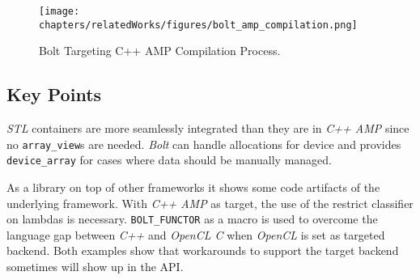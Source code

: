 \begin{figure}
\center
\texttt{[image: chapters/relatedWorks/figures/bolt\_amp\_compilation.png]}
\caption{Bolt Targeting C++ AMP Compilation Process.}
\label{fig:boltAmpCompilation}
\end{figure}

\subsection{Key Points}
\textit{STL} containers are more seamlessly integrated than they are in \textit{C++ AMP} since no \texttt{array\_view}s are needed. \textit{Bolt} can handle allocations for device and provides \texttt{device\_array} for cases where data should be manually managed.

As a library on top of other frameworks it shows some code artifacts of the underlying framework. With \textit{C++ AMP} as target, the use of the restrict classifier on lambdas is necessary. \texttt{BOLT\_FUNCTOR} as a macro is used to overcome the language gap between \textit{C++} and \textit{OpenCL C} when \textit{OpenCL} is set as targeted backend. Both examples show that workarounds to support the target backend sometimes will show up in the API. 